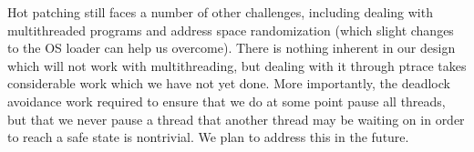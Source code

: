 Hot patching still faces a number of other
challenges, including dealing with multithreaded programs and address
space randomization (which slight changes to the OS loader can help us
overcome).  
There is nothing inherent in our design which will not work with
multithreading, but dealing with it through ptrace takes considerable
work which we have not yet done. More importantly, the deadlock
avoidance work required to ensure that we do at some point pause all
threads, but that we never pause a thread that another thread may be
waiting on in order to reach a safe state is nontrivial. We plan to
address this in the future.
%

